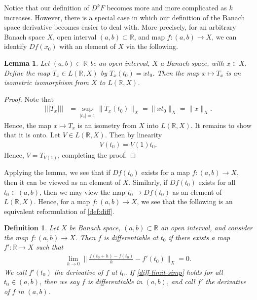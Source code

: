 \documentclass[12pt,reqno]{amsart}
\numberwithin{equation}{section}  %
\newcommand{\rr}{\mathbb{R}}
\newtheorem{lemma}[theorem]{Lemma}
\newtheorem{definition}[theorem]{Definition}
\begin{document}
Notice that our definition of $D^{k}F$ becomes more and more complicated as $k$
increases. However, there is a special case in which our definition of the
Banach space derivative becomes easier to deal with. More precisely, for an
arbitrary Banach space $X$, open interval $(a,b) \subset \rr$, and map $f:(a,b)
\to X$, we can identify $Df(x_0)$ with an element of $X$ via the following.
%
%
%
%
%
%
%
%
\begin{lemma}
\label{lem:isometry} Let $(a,b) \subset \rr$ be an open interval, $X$ a Banach
space, with $x \in X$. Define the map $T_x \in L\left ( \rr , X \right )$ by
$T_x(t_0) = x t_0$. Then the map $x \mapsto T_x$ is an
isometric isomorphism from
$X$ to $L(\rr , X)$. 
\end{lemma}
%
%
\begin{proof} Note that 
%
%
\begin{equation*}
\begin{split}
| | | T_x | | |
& = \sup_{|t_0| = 1} \| T_x (t_0) \|_X
= \| x t_0\|_X
= \|x\|_X.
\end{split}
\end{equation*}
%
%
Hence, the map $x \mapsto T_x$ is an isometry from $X$ into $L(\rr,
X)$. It remains to show that it is onto. Let $V \in L( \rr, X)$. Then
by linearity
%
%
\begin{equation*}
\begin{split}
V(t_0) = V(1)t_0. 
\end{split}
\end{equation*}
%
%
Hence, $V = T_{V(1)}$, completing the proof. 
\end{proof}
%
%
Applying the lemma, we see that if $Df(t_0)$ exists for a map $f: (a,b) \to X$,
then it can be viewed as an
element of $X$. Similarly, if $Df(t_0)$ exists for all $t_0 \in (a,b)$, then
we may view the map $t_0 \to Df(t_0)$ as an
element of $L( \rr, X)$. Hence, for a
map $f:(a,b) \to X$, we see that the following is an equivalent
reformulation of \autoref{def:diff}. 
\begin{definition}
\label{def:diff-simp}
Let $X$ be Banach space, $(a,b) \subset \rr$ an open interval, and
consider the map $f: (a,b) \to X$.
Then $f$ is \emph{differentiable at $t_0$} if there exists a map
$f': \rr \to X$ such that 
%
%
%
%
\begin{equation}
\label{diff-limit-simp}
\begin{split}
\lim_{h \to 0} \| \frac{f(t_0+ h) - f(t_0) 
}{h} - f'(t_0) \|_X = 0.
\end{split}
\end{equation}
%
%
We call $f'(t_0)$ the \emph{derivative of $f$ at $t_0$}.
If \eqref{diff-limit-simp}
holds for all $t_0 \in (a,b)$, then we say $f$ is \emph{differentiable in
$(a,b)$}, and call $f'$ the
\emph{derivative of $f$ in $(a,b)$}.  
\end{definition}
\end{document}
